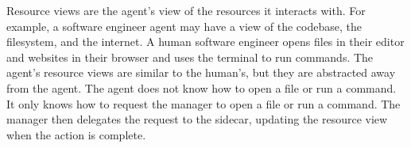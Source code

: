 \documentclass[a4paper,twocolumn,11pt]{quantumarticle}
\begin{document}
Resource views are the agent's view of the resources it interacts with. For example, a software engineer agent may have a view of the codebase, the filesystem, and the internet. A human software engineer opens files in their editor and websites in their browser and uses the terminal to run commands. The agent's resource views are similar to the human's, but they are abstracted away from the agent. The agent does not know how to open a file or run a command. It only knows how to request the manager to open a file or run a command. The manager then delegates the request to the sidecar, updating the resource view when the action is complete.

\end{document}
